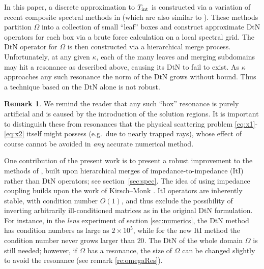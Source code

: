 \documentclass[11pt,final]{amsart}
\theoremstyle{definition}
\newtheorem{remark}{Remark}
\numberwithin{remark}{section}
\numberwithin{definition}{section}
\numberwithin{pro}{section}
\begin{document}
In this paper, a discrete approximation to $T_{\rm int}$ is constructed via a variation of recent
composite spectral methods in \cite{ONspectralcomposite,2012_martinsson_spectralcomposite}
(which are also similar to \cite{2013_yu_chen_totalwave}).
These methods partition $\Omega$ into a collection of small ``leaf''
boxes and construct
approximate DtN operators for each box via a brute force calculation on a local
spectral grid.  The DtN operator for $\Omega$ is then
constructed via a hierarchical merge process.
Unfortunately, at any given $\kappa$,
each of the many leaves and merging subdomains may hit a resonance as described above, causing its
DtN to fail to exist.
As $\kappa$ approaches any such resonance the norm of the DtN grows without bound.
Thus a technique based on the DtN alone is not robust.
\begin{remark}
We remind the reader that any such ``box'' resonance is purely artificial and is caused by the introduction of the solution regions.
It is important to distinguish these from
resonances that the physical scattering problem \eqref{eq:x1}-\eqref{eq:x2}
itself might possess (e.g.\ due to nearly trapped rays),
whose effect of course cannot be avoided in {\em any}
accurate numerical method.
\end{remark}

One contribution of the present work is to present
a robust improvement to the methods of \cite{ONspectralcomposite,2012_martinsson_spectralcomposite},
built upon hierarchical merges of impedance-to-impedance (ItI) rather than
DtN operators; see section~\ref{sec:spec}.
The idea of using impedance coupling builds upon the work of
Kirsch--Monk \cite{kirschmonk94}.
ItI operators are inherently stable, with condition number $O(1)$,
and thus exclude the
possibility of inverting arbitrarily ill-conditioned matrices as in
the original DtN formulation.
For instance, in the \emph{lens} experiment of section \ref{sec:numerics},
the DtN method has condition numbers as large as $2 \times 10^{5}$, while for the new ItI
method the condition number never grows larger than $20$.
The DtN of the whole domain $\Omega$ is still needed; however, if $\Omega$ has a resonance,
the size of $\Omega$ can be changed slightly to avoid the resonance (see remark \ref{re:omegaRes}).
\end{document}
